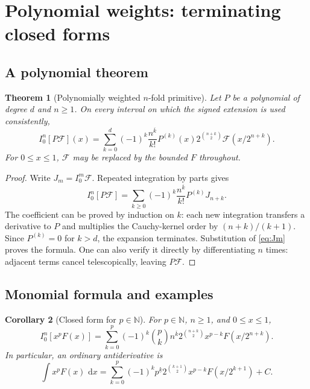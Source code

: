 \documentclass[11pt,oneside]{article}
\numberwithin{equation}{section}
\newtheorem{theorem}{Theorem}[section]
\newtheorem{corollary}[theorem]{Corollary}
\theoremstyle{definition}
\theoremstyle{remark}
\newcommand{\N}{\mathbb N}
\newcommand{\dd}{\,\mathrm d}
\newcommand{\fall}[2]{#1^{\underline{#2}}}
\newcommand{\rise}[2]{#1^{\overline{#2}}}
\begin{document}
\section{Polynomial weights: terminating closed forms}
\label{sec:polynomial}

\subsection{A polynomial theorem}

\begin{theorem}[Polynomially weighted $n$-fold primitive]
\label{thm:poly-primitive}
Let $P$ be a polynomial of degree $d$ and $n\ge1$.  On every interval on which the signed
extension is used consistently,
\begin{equation}
 \boxed{
 I_0^n[P\mathcal F](x)
 =\sum_{k=0}^{d}(-1)^k\frac{\rise nk}{k!}P^{(k)}(x)
 2^{\binom{n+k}{2}}\mathcal F(x/2^{n+k}).}
 \label{eq:poly-primitive}
\end{equation}
For $0\le x\le1$, $\mathcal F$ may be replaced by the bounded $F$ throughout.
\end{theorem}

\begin{proof}
Write $J_m=I_0^m\mathcal F$.  Repeated integration by parts gives
\[
 I_0^n[P\mathcal F]
 =\sum_{k\ge0}(-1)^k\frac{\rise nk}{k!}P^{(k)}J_{n+k}.
\]
The coefficient can be proved by induction on $k$: each new integration transfers a
derivative to $P$ and multiplies the Cauchy-kernel order by $(n+k)/(k+1)$.  Since
$P^{(k)}=0$ for $k>d$, the expansion terminates.  Substitution of \eqref{eq:Jm} proves the
formula.  One can also verify it directly by differentiating $n$ times: adjacent terms
cancel telescopically, leaving $P\mathcal F$.
\end{proof}

\subsection{Monomial formula and examples}

\begin{corollary}[Closed form for $p\in\N$]
\label{cor:monomial}
For $p\in\N$, $n\ge1$, and $0\le x\le1$,
\begin{equation}
 \boxed{
 I_0^n[x^pF(x)]
 =\sum_{k=0}^{p}(-1)^k\binom pk\rise nk
 2^{\binom{n+k}{2}}x^{p-k}F(x/2^{n+k}).}
 \label{eq:monomial-nfold}
\end{equation}
In particular, an ordinary antiderivative is
\begin{equation}
 \boxed{
 \int x^pF(x)\,\dd x
 =\sum_{k=0}^{p}(-1)^k\fall pk
 2^{\binom{k+1}{2}}x^{p-k}F(x/2^{k+1})+C.}
 \label{eq:monomial-antiderivative}
\end{equation}
\end{corollary}
\end{document}
